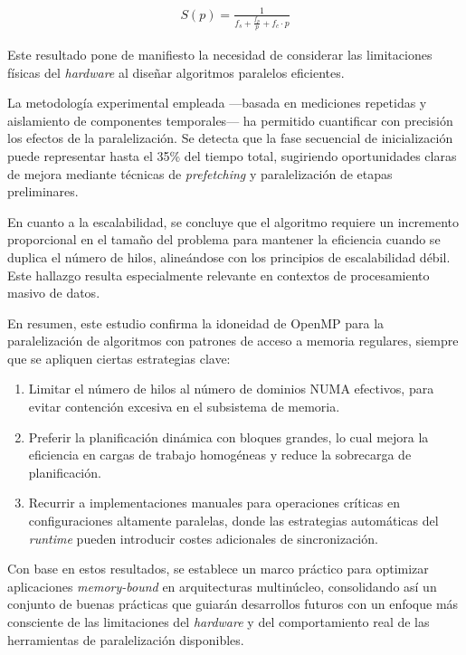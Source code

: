     \begin{align}
        S(p) = \frac{1}{f_s + \frac{f_p}{p} + f_c \cdot p}
    \end{align}
    
    Este resultado pone de manifiesto la necesidad de considerar las limitaciones físicas del \textit{hardware} al diseñar algoritmos paralelos eficientes.
    
    La metodología experimental empleada —basada en mediciones repetidas y aislamiento de componentes temporales— ha permitido cuantificar con precisión los efectos de la paralelización. Se detecta que la fase secuencial de inicialización puede representar hasta el 35\% del tiempo total, sugiriendo oportunidades claras de mejora mediante técnicas de \textit{prefetching} y paralelización de etapas preliminares.
    
    En cuanto a la escalabilidad, se concluye que el algoritmo requiere un incremento proporcional en el tamaño del problema para mantener la eficiencia cuando se duplica el número de hilos, alineándose con los principios de escalabilidad débil. Este hallazgo resulta especialmente relevante en contextos de procesamiento masivo de datos.
    
    En resumen, este estudio confirma la idoneidad de OpenMP para la paralelización de algoritmos con patrones de acceso a memoria regulares, siempre que se apliquen ciertas estrategias clave:
    
    \begin{enumerate}
        \item Limitar el número de hilos al número de dominios NUMA efectivos, para evitar contención excesiva en el subsistema de memoria.
        \item Preferir la planificación dinámica con bloques grandes, lo cual mejora la eficiencia en cargas de trabajo homogéneas y reduce la sobrecarga de planificación.
        \item Recurrir a implementaciones manuales para operaciones críticas en configuraciones altamente paralelas, donde las estrategias automáticas del \textit{runtime} pueden introducir costes adicionales de sincronización.
    \end{enumerate}

    Con base en estos resultados, se establece un marco práctico para optimizar aplicaciones \textit{memory-bound} en arquitecturas multinúcleo, consolidando así un conjunto de buenas prácticas que guiarán desarrollos futuros con un enfoque más consciente de las limitaciones del \textit{hardware} y del comportamiento real de las herramientas de paralelización disponibles.
